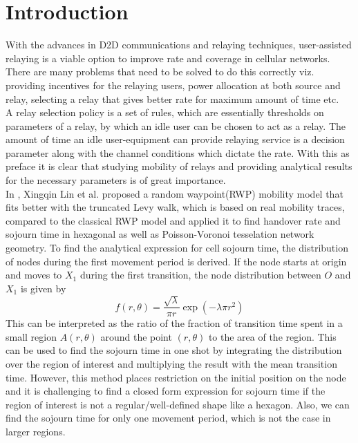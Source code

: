 \chapter{Introduction}
	With the advances in D2D communications and relaying techniques, user-assisted relaying is a viable option to improve rate and coverage in cellular networks. There are many problems that need to be solved to do this correctly viz. providing incentives for the relaying users, power allocation at both source and relay, selecting a relay that gives better rate for maximum amount of time etc. \\ 


	A relay selection policy is a set of rules, which are essentially thresholds on parameters of a relay, by which an idle user can be chosen to act as a relay. The amount of time an idle user-equipment can provide relaying service is a decision parameter along with the channel conditions which dictate the rate. With this as preface it is clear that studying mobility of relays and providing analytical results for the necessary parameters is of great importance. \\
	
	
	In \cite{lin}, Xingqin Lin et al. proposed a random waypoint(RWP) mobility model that fits better with the truncated Levy walk, which is based on real mobility traces, compared to the classical RWP model and applied it to find handover rate and sojourn time in hexagonal as well as Poisson-Voronoi tesselation network geometry. To find the analytical expression for cell sojourn time, the distribution of nodes during the first movement period is derived. If the node starts at origin and  moves to $X_1$ during the first transition, the node distribution between $O$ and $X_1$ is given by 
	\newpage
	\setcounter{page}{2}
	\begin{equation} \label{eq:nodeDist}
		f(r,\theta) = \frac{\sqrt{\lambda}}{\pi r} \exp(-\lambda \pi r^2)
	\end{equation}
	This can be interpreted as the ratio of the fraction of transition time spent in a small region $A(r,\theta)$ around the point $(r,\theta)$ to the area of the region. This can be used to find the sojourn time in one shot by integrating the distribution over the region of interest and multiplying the result with the mean transition time. However, this method places restriction on the initial position on the node and it is challenging to find a closed form expression for sojourn time if the region of interest is not a regular/well-defined shape like a hexagon. Also, we can find the sojourn time for only one movement period, which is not the case in larger regions.     
	
